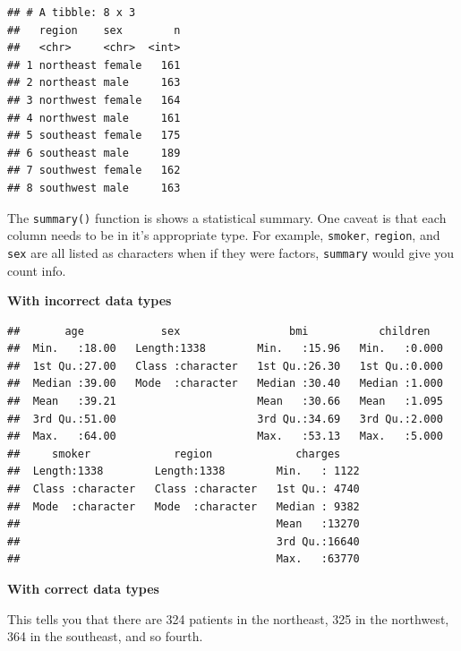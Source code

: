 \documentclass[openany]{book}
\newenvironment{Shaded}{\begin{snugshade}}{\end{snugshade}}
\newcommand{\KeywordTok}[1]{\textcolor[rgb]{0.13,0.29,0.53}{\textbf{#1}}}
\newcommand{\NormalTok}[1]{#1}
\newcommand{\OperatorTok}[1]{\textcolor[rgb]{0.81,0.36,0.00}{\textbf{#1}}}
\newcommand{\StringTok}[1]{\textcolor[rgb]{0.31,0.60,0.02}{#1}}
\begin{document}
\begin{verbatim}
## # A tibble: 8 x 3
##   region    sex        n
##   <chr>     <chr>  <int>
## 1 northeast female   161
## 2 northeast male     163
## 3 northwest female   164
## 4 northwest male     161
## 5 southeast female   175
## 6 southeast male     189
## 7 southwest female   162
## 8 southwest male     163
\end{verbatim}

The \texttt{summary()} function is shows a statistical summary. One caveat is that each column needs to be in it's appropriate type. For example, \texttt{smoker}, \texttt{region}, and \texttt{sex} are all listed as characters when if they were factors, \texttt{summary} would give you count info.

\textbf{With incorrect data types}

\begin{Shaded}
\end{Shaded}

\begin{verbatim}
##       age            sex                 bmi           children    
##  Min.   :18.00   Length:1338        Min.   :15.96   Min.   :0.000  
##  1st Qu.:27.00   Class :character   1st Qu.:26.30   1st Qu.:0.000  
##  Median :39.00   Mode  :character   Median :30.40   Median :1.000  
##  Mean   :39.21                      Mean   :30.66   Mean   :1.095  
##  3rd Qu.:51.00                      3rd Qu.:34.69   3rd Qu.:2.000  
##  Max.   :64.00                      Max.   :53.13   Max.   :5.000  
##     smoker             region             charges     
##  Length:1338        Length:1338        Min.   : 1122  
##  Class :character   Class :character   1st Qu.: 4740  
##  Mode  :character   Mode  :character   Median : 9382  
##                                        Mean   :13270  
##                                        3rd Qu.:16640  
##                                        Max.   :63770
\end{verbatim}

\textbf{With correct data types}

This tells you that there are 324 patients in the northeast, 325 in the northwest, 364 in the southeast, and so fourth.

\begin{Shaded}
\end{Shaded}
\end{document}
